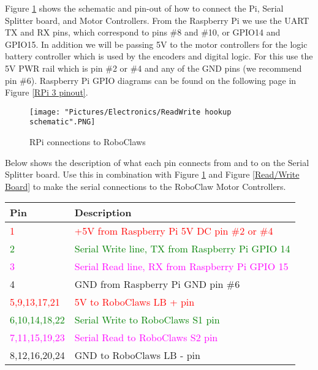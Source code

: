 \documentclass[12pt]{article}
\begin{document}
Figure \ref{rpi to rc} shows the schematic and pin-out of how to connect the Pi, Serial Splitter board, and Motor Controllers. From the Raspberry Pi we use the UART TX and RX pins, which correspond to pins \#8 and \#10, or GPIO14 and GPIO15. In addition we will be passing 5V to the motor controllers for the logic battery controller which is used by the encoders and digital logic. For this use the 5V PWR rail which is pin  \#2 or \#4 and any of the GND pins (we recommend pin \#6). Raspberry Pi GPIO diagrams can be found on the following page in Figure \ref{RPi 3 pinout}.

\begin{figure}[H]
 	\centering
	\texttt{[image: "Pictures/Electronics/ReadWrite hookup schematic".PNG]}
 	\caption{RPi connections to RoboClaws}
	\label{rpi to rc}
\end{figure}


Below shows the description of what each pin connects from and to on the Serial Splitter board. Use this in combination with Figure \ref{rpi to rc} and Figure \ref{Read/Write Board} to make the serial connections to the RoboClaw Motor Controllers. 

\bigskip

\begin{tabular}[2] {| p{2.5cm} | p{11cm} |}
	\hline
	\textbf{Pin} & \textbf{Description} \\ \hline
	\textcolor{red}{1} & \textcolor{red}{+5V from Raspberry Pi 5V DC pin \#2 or \#4} \\ \hline
	\textcolor{green}{2} & \textcolor{green}{Serial Write line, TX from Raspberry Pi GPIO 14} \\ \hline
	\textcolor{magenta}{3} & \textcolor{magenta}{Serial Read line, RX from Raspberry Pi GPIO 15}	\\ \hline
	4 & GND from Raspberry Pi GND pin \#6 \\ \hline
	\textcolor{red}{5,9,13,17,21} & \textcolor{red}{5V to RoboClaws LB + pin} \\ \hline
	\textcolor{green}{6,10,14,18,22} & \textcolor{green}{Serial Write to RoboClaws S1 pin} \\ \hline
	\textcolor{magenta}{7,11,15,19,23} & \textcolor{magenta}{Serial Read to RoboClaws S2 pin} \\ \hline
	8,12,16,20,24 & GND to RoboClaws LB - pin \\ \hline 
\end{tabular}

\bigskip 
\end{document}
